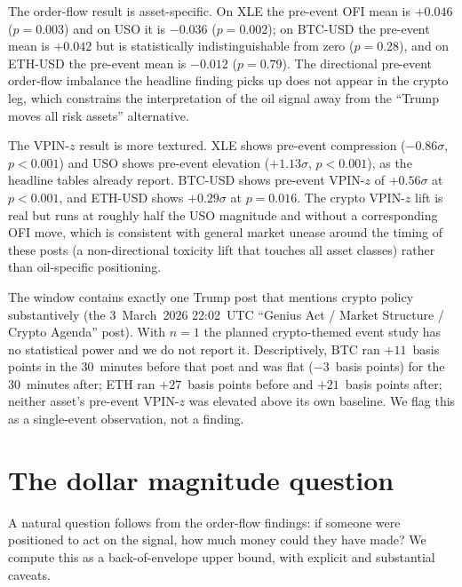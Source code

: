 \documentclass[11pt,a4paper]{article}
\begin{document}
The order-flow result is asset-specific. On XLE the pre-event OFI mean is $+0.046$ ($p = 0.003$) and on USO it is $-0.036$ ($p = 0.002$); on BTC-USD the pre-event mean is $+0.042$ but is statistically indistinguishable from zero ($p = 0.28$), and on ETH-USD the pre-event mean is $-0.012$ ($p = 0.79$). The directional pre-event order-flow imbalance the headline finding picks up does not appear in the crypto leg, which constrains the interpretation of the oil signal away from the ``Trump moves all risk assets'' alternative.

The VPIN-$z$ result is more textured. XLE shows pre-event compression ($-0.86\sigma$, $p < 0.001$) and USO shows pre-event elevation ($+1.13\sigma$, $p < 0.001$), as the headline tables already report. BTC-USD shows pre-event VPIN-$z$ of $+0.56\sigma$ at $p < 0.001$, and ETH-USD shows $+0.29\sigma$ at $p = 0.016$. The crypto VPIN-$z$ lift is real but runs at roughly half the USO magnitude and without a corresponding OFI move, which is consistent with general market unease around the timing of these posts (a non-directional toxicity lift that touches all asset classes) rather than oil-specific positioning.

The window contains exactly one Trump post that mentions crypto policy substantively (the 3~March~2026 22:02~UTC ``Genius Act / Market Structure / Crypto Agenda'' post). With $n = 1$ the planned crypto-themed event study has no statistical power and we do not report it. Descriptively, BTC ran $+11$~basis points in the 30~minutes before that post and was flat ($-3$~basis points) for the 30~minutes after; ETH ran $+27$~basis points before and $+21$~basis points after; neither asset's pre-event VPIN-$z$ was elevated above its own baseline. We flag this as a single-event observation, not a finding.

\section{The dollar magnitude question}\label{sec:dollars}

A natural question follows from the order-flow findings: if someone were positioned to act on the signal, how much money could they have made? We compute this as a back-of-envelope upper bound, with explicit and substantial caveats.
\end{document}
